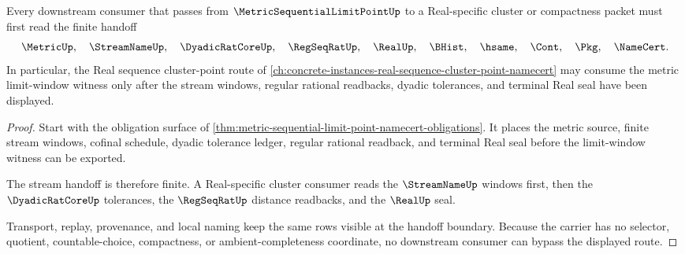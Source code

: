 \begin{theorem}
\label{thm:metric-sequential-limit-point-stream-handoff}
Every downstream consumer that passes from $\MetricSequentialLimitPointUp$ to a Real-specific cluster or compactness packet must first read the finite handoff
$$
\MetricUp,\quad
\StreamNameUp,\quad
\DyadicRatCoreUp,\quad
\RegSeqRatUp,\quad
\RealUp,\quad
\BHist,\quad
\hsame,\quad
\Cont,\quad
\Pkg,\quad
\NameCert .
$$
In particular, the Real sequence cluster-point route of \autoref{ch:concrete-instances-real-sequence-cluster-point-namecert} may consume the metric limit-window witness only after the stream windows, regular rational readbacks, dyadic tolerances, and terminal Real seal have been displayed.
\end{theorem}
\begin{proof}
Start with the obligation surface of \autoref{thm:metric-sequential-limit-point-namecert-obligations}. It places the metric source, finite stream windows, cofinal schedule, dyadic tolerance ledger, regular rational readback, and terminal Real seal before the limit-window witness can be exported.

The stream handoff is therefore finite. A Real-specific cluster consumer reads the $\StreamNameUp$ windows first, then the $\DyadicRatCoreUp$ tolerances, the $\RegSeqRatUp$ distance readbacks, and the $\RealUp$ seal.

Transport, replay, provenance, and local naming keep the same rows visible at the handoff boundary. Because the carrier has no selector, quotient, countable-choice, compactness, or ambient-completeness coordinate, no downstream consumer can bypass the displayed route.
\end{proof}



